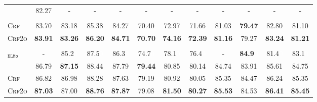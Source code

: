 \documentclass[11pt]{article}
\newcommand{\white}[1]{\textcolor{white}{#1}}
\begin{document}
\begin{table*}[tb!]
\begin{small}
\begin{tabular}{L c ccc ccc c ccc}
            \citet{zhou-etal-2020-parsing}                                    & 82.27                       & -                           & -                         & -              & -                        & -              & -              & -              & -                      & -              & -              \\\\[-10pt]
            \textsc{Crf}                                                      & 83.70                       & 83.18                       & 85.38                     & 84.27          & 70.40                    & 72.97          & 71.66          & 81.03          & \textbf{79.47}         & 82.80          & 81.10          \\
            \textsc{Crf2o}                                                    & \textbf{83.91}              & \textbf{83.26}              & \textbf{86.20}            & \textbf{84.71} & \textbf{70.70}           & \textbf{74.16} & \textbf{72.39} & \textbf{81.16} & 79.27                  & \textbf{83.24} & \textbf{81.21} \\\\[-10pt]
            \citet{li-etal-2019-dependency}$_\texttt{ELMo}$                   & -                           & 85.2\white{0}               & 87.5\white{0}             & 86.3\white{0}  & 74.7\white{0}            & 78.1\white{0}  & 76.4\white{0}  & -              & \textbf{84.9\white{0}} & 81.4\white{0}  & 83.1\white{0}  \\
            \citet{zhou-etal-2022-fast}         & 86.79                       & \textbf{87.15}              & 88.44                     & 87.79          & \textbf{79.44}           & 80.85          & 80.14          & 84.74          & 83.91                  & 85.61          & 84.75          \\
            \textsc{Crf}                               & 86.82                       & 86.98                       & 88.28                     & 87.63          & 79.19                    & 80.92          & 80.05          & 85.35          & 84.47                  & 86.24          & 85.35          \\
            \textsc{Crf2o}                             & \textbf{87.03}              & 87.00                       & \textbf{88.76}            & \textbf{87.87} & 79.08                    & \textbf{81.50} & \textbf{80.27} & \textbf{85.53} & 84.53                  & \textbf{86.41} & \textbf{85.45} \\

\end{tabular}
\end{small}
\end{table*}
\end{document}
